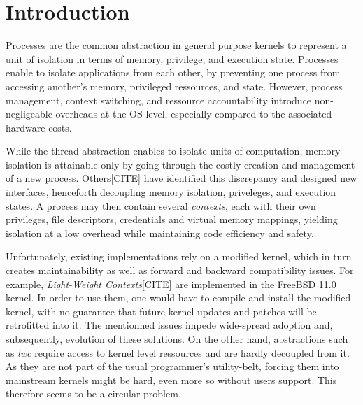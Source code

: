\chapter{Introduction}

Processes are the common abstraction in general purpose kernels to represent a
unit of isolation in terms of memory, privilege, and execution state.
Processes enable to isolate applications from each other, by preventing one process
from accessing another's memory, privileged ressources, and state.
However, process management, context switching, and ressource accountability introduce 
non-negligeable overheads at the OS-level, especially compared to the associated hardware costs.

While the thread abstraction enables to isolate units of computation,
memory isolation is attainable only by going through the costly creation and management 
of a new process.
Others[CITE] have identified this discrepancy and designed new interfaces, henceforth decoupling
memory isolation, priveleges, and execution states.
A process may then contain several \textit{contexts}, each with their own privileges,
file descriptors, credentials and virtual memory mappings, yielding isolation at a low overhead while
maintaining code efficiency and safety.

Unfortunately, existing implementations rely on a modified kernel, which in turn 
creates maintainability as well as forward and backward compatibility issues.
For example, \textit{Light-Weight Contexts}[CITE] are implemented in the FreeBSD 11.0 kernel.
In order to use them, one would have to compile and install the modified kernel,
with no guarantee that future kernel updates and patches will be retrofitted into it.
The mentionned issues impede wide-spread adoption and, subsequently, evolution of these solutions.
On the other hand, abstractions such as \textit{lwc} require access to kernel level ressources 
and are hardly decoupled from it.
As they are not part of the usual programmer's utility-belt, forcing them into mainstream 
kernels might be hard, even more so without users support.
This therefore seems to be a circular problem.

